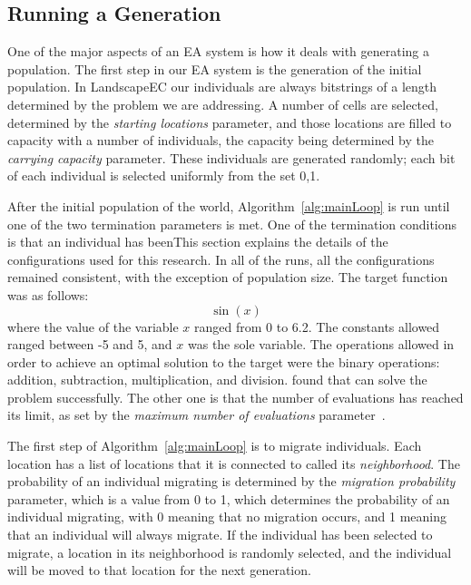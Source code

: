 \documentclass[12pt]{article}
\begin{document}
\label{sec:background}

\subsection{Running a Generation}
\label{sec:Running a Generation}

One of the major aspects of an EA system is how it deals with generating a population. The first step in our EA system is the generation of the initial population. In LandscapeEC our individuals are always bitstrings of a length determined by the problem we are addressing. A number of cells are selected, determined by the \emph{starting locations} parameter, and those locations are filled to capacity with a number of individuals, the capacity being determined by the \emph{carrying capacity} parameter. These individuals are generated randomly; each bit of each individual is selected uniformly from the set {0,1}.

After the initial population of the world, Algorithm~\ref{alg:mainLoop} is run until one of the two termination parameters is met. One of the termination conditions is that an individual has beenThis section explains the details of the configurations used for this research. In all of the runs, all the configurations remained consistent, with the exception of population size. The target function was as follows:
\[
	\sin(x)
\]
where the value of the variable $x$ ranged from 0 to 6.2. The constants allowed ranged between -5 and 5, and $x$ was the sole variable. The operations allowed in order to achieve an optimal solution to the target were the binary operations: addition, subtraction, multiplication, and division. found that can solve the problem successfully. The other one is that the number of evaluations has reached its limit, as set by the \emph{maximum number of evaluations} parameter~\cite{Gottlieb:2002:EAS:638548.638550}. 

The first step of Algorithm~\ref{alg:mainLoop} is to migrate individuals. Each location has a list of locations that it is connected to called its \emph{neighborhood}. The probability of an individual migrating is determined by the \emph{migration probability} parameter, which is a value from 0 to 1, which determines the probability of an individual migrating, with 0 meaning that no migration occurs, and 1 meaning that an individual will always migrate. If the individual has been selected to migrate, a location in its neighborhood is randomly selected, and the individual will be moved to that location for the next generation.
\end{document}
